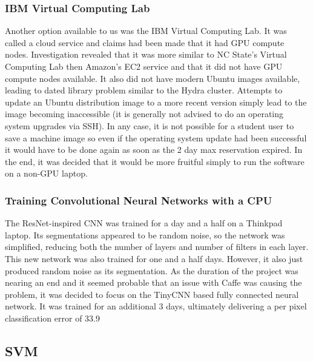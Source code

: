 \documentclass[12pt]{article}
\begin{document}
\subsubsection{IBM Virtual Computing Lab}
	Another option available to us was the IBM Virtual Computing Lab. It was called a cloud service and claims had been made that it had GPU compute nodes.  Investigation revealed that it was more similar to NC State's Virtual Computing Lab then Amazon's EC2 service and that it did not have GPU compute nodes available.  It also did not have modern Ubuntu images available, leading to dated library problem similar to the Hydra cluster.  Attempts to update an Ubuntu distribution image to a more recent version simply lead to the image becoming inaccessible (it is generally not advised to do an operating system upgrades via SSH).  In any case, it is not possible for a student user to save a machine image so even if the operating system update had been successful it would have to be done again as soon as the 2 day max reservation expired.  In the end, it was decided that it would be more fruitful simply to run the software on a non-GPU laptop.

	\subsubsection{Training Convolutional Neural Networks with a CPU}

	The ResNet-inspired CNN was trained for a day and a half on a Thinkpad laptop.  Its segmentations appeared to be random noise, so the network was simplified, reducing both the number of layers and  number of filters in each layer.  This new network was also trained for one and a half days.  However, it also just produced random noise as its segmentation.  As the duration of the project was nearing an end and it seemed probable that an issue with Caffe was causing the problem, it was decided to focus on the TinyCNN based fully connected neural network.  It was trained for an additional 3 days, ultimately delivering a per pixel classification error of 33.9%
	\subsection{SVM}
\end{document}
